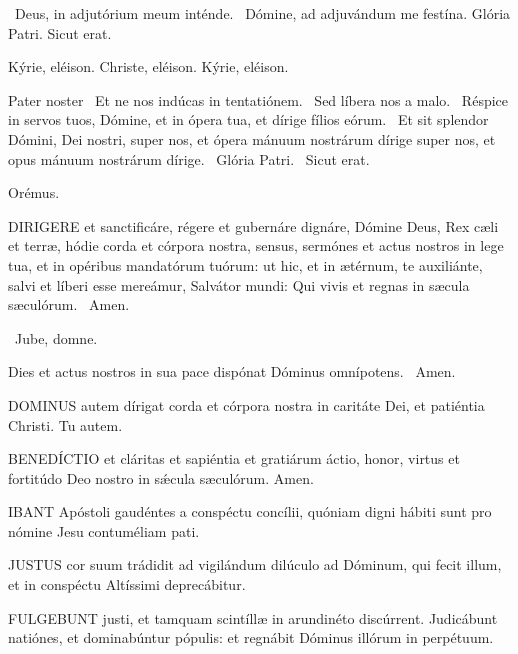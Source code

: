 \V\ Deus, in adjutórium meum inténde. \R\ Dómine, ad adjuvándum me festína.  Glória Patri. Sicut erat.

Kýrie, eléison. Christe, eléison. Kýrie, eléison.

Pater noster  \V\ Et ne nos indúcas in tentatiónem. \R\ Sed líbera nos a malo. \V\ Réspice in servos tuos, Dómine, et in ópera tua, et dírige fílios eórum. \R\ Et sit splendor Dómini, Dei nostri, super nos, et ópera mánuum nostrárum dírige super nos, et opus mánuum nostrárum dírige. \V\ Glória Patri. \R\ Sicut erat.

Orémus. 

\lettrine[lines=2]{D}{IRIGERE} et sanctificáre, régere et gubernáre dignáre, Dómine Deus, Rex cæli et terræ, hódie corda et córpora nostra, sensus, sermónes et actus nostros in lege tua, et in opéribus mandatórum tuórum: ut hic, et in ætérnum, te auxiliánte, salvi et líberi esse mereámur, Salvátor mundi: Qui vivis et regnas in sæcula sæculórum. \R\ Amen.

\V\ Jube, domne.

 Dies et actus nostros in sua pace dispónat Dóminus omnípotens. \R\ Amen.


\lettrine[lines=2]{D}{OMINUS} autem dírigat corda et córpora nostra in caritáte Dei, et patiéntia Christi. Tu autem.



\lettrine[lines=2]{B}{ENEDÍCTIO} et cláritas et sapiéntia et gratiárum áctio, honor, virtus et fortitúdo Deo nostro in sǽcula sæculórum. Amen.



\lettrine[lines=2]{I}{BANT} Apóstoli gaudéntes a conspéctu concílii, quóniam digni hábiti sunt pro nómine Jesu contuméliam pati.


\lettrine[lines=2]{J}{USTUS} cor suum trádidit ad vigilándum dilúculo ad Dóminum, qui fecit illum, et in conspéctu Altíssimi deprecábitur.


\lettrine[lines=2]{F}{ULGEBUNT} justi, et tamquam scintíllæ in arundinéto discúrrent. Judicábunt natiónes, et dominabúntur pópulis: et regnábit Dóminus illórum in perpétuum.


